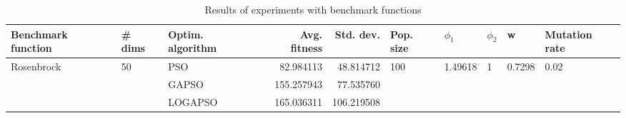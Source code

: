 \begin{table}
\centering
\caption{Results of experiments with benchmark functions}
\begin{tabular}{lllrrlllll}
\toprule
         Benchmark function &             \# dims & Optim. algorithm &  Avg. fitness &  Std. dev. &            Pop. size &               $\phi_{1}$ &         $\phi_{2}$ &                       w &         Mutation rate \\
\midrule
\multirow{3}{*}{Rosenbrock} & \multirow{3}{*}{50} &              PSO &     82.984113 &  48.814712 & \multirow{3}{*}{100} & \multirow{3}{*}{1.49618} & \multirow{3}{*}{1} & \multirow{3}{*}{0.7298} & \multirow{3}{*}{0.02} \\
                            &                     &            GAPSO &    155.257943 &  77.535760 &                      &                          &                    &                         &                       \\
                            &                     &          LOGAPSO &    165.036311 & 106.219508 &                      &                          &                    &                         &                       \\
\bottomrule
\end{tabular}
\end{table}
